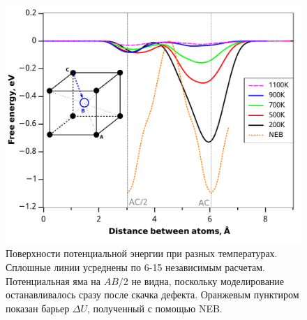 \documentclass[master,14pt,subf,href,colorlinks=true
]{disser}
\begin{document}
\begin{figure}[h]	%
\begin{center}
\includegraphics[width=.7\linewidth]{FES_(T).pdf}
\end{center}
\caption{\label{graph_MetaD_FES} Поверхности потенциальной энергии при разных температурах. Сплошные линии усреднены по 6-15 независимым расчетам. Потенциальная яма на $AB/2$ не видна, поскольку моделирование останавливалось сразу после скачка дефекта. Оранжевым пунктиром показан барьер $\Delta U$, полученный с помощью NEB.}
\end{figure}
\end{document}

